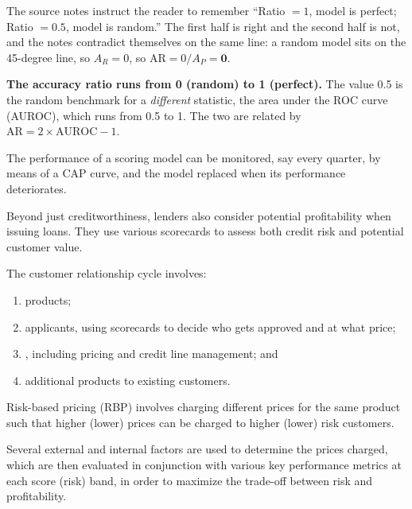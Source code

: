 \begin{crtrapbox}
The source notes instruct the reader to remember ``Ratio $=1$, model is perfect;
Ratio $=0.5$, model is random.'' The first half is right and the second half is
not, and the notes contradict themselves on the same line: a random model sits on
the 45-degree line, so $A_R = 0$, so $\mathrm{AR} = 0/A_P = \mathbf{0}$.

\smallskip
\textbf{The accuracy ratio runs from 0 (random) to 1 (perfect).} The value 0.5 is
the random benchmark for a \emph{different} statistic, the area under the ROC
curve (AUROC), which runs from 0.5 to 1. The two are related by
$\mathrm{AR} = 2\times\mathrm{AUROC} - 1$.
\end{crtrapbox}

The performance of a scoring model can be monitored, say every quarter, by means
of a CAP curve, and the model replaced when its performance deteriorates.


Beyond just creditworthiness, lenders also consider potential profitability when
issuing loans. They use various scorecards to assess both credit risk and
potential customer value.

The customer relationship cycle involves:

\begin{enumerate}
\item {} products;
\item {} applicants, using scorecards to decide who gets approved
and at what price;
\item {}, including pricing and credit line management; and
\item {} additional products to existing customers.
\end{enumerate}


\begin{crdefbox}
Risk-based pricing (RBP) involves charging different prices for the same product
such that higher (lower) prices can be charged to higher (lower) risk customers.
\end{crdefbox}

Several external and internal factors are used to determine the prices charged,
which are then evaluated in conjunction with various key performance metrics at
each score (risk) band, in order to maximize the trade-off between risk and
profitability.
